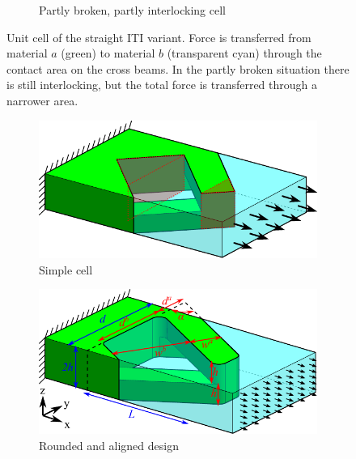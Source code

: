 \begin{figure}
\begin{subfigure}[B]{.32\textwidth}
		\caption{Partly broken, partly interlocking cell}
		\label{interlocking:fig:straight_model_broken}
	\end{subfigure}
	\caption{Unit cell of the straight ITI variant. Force is transferred from material $a$ (green) to material $b$ (transparent cyan) through the contact area on the cross beams. In the partly broken situation there is still interlocking, but the total force is transferred through a narrower area.}
\end{figure}

\begin{figure}
	\centering
	\begin{subfigure}[B]{.25\textwidth}
		\centering
		\includegraphics{sources-method-diagonal_model_simple_v5.pdf}
		\caption{Simple cell}
		\label{interlocking:fig:diagonal_model_simple}
	\end{subfigure}
	\begin{subfigure}[B]{.33\textwidth}
		\centering
		\includegraphics{sources-method-diagonal_model_v5_no_failures.pdf}
		\caption{Rounded and aligned design}
		\label{interlocking:fig:diagonal_model}
	\end{subfigure}
	\begin{subfigure}[B]{.33\textwidth}

\end{subfigure}
\end{figure}
